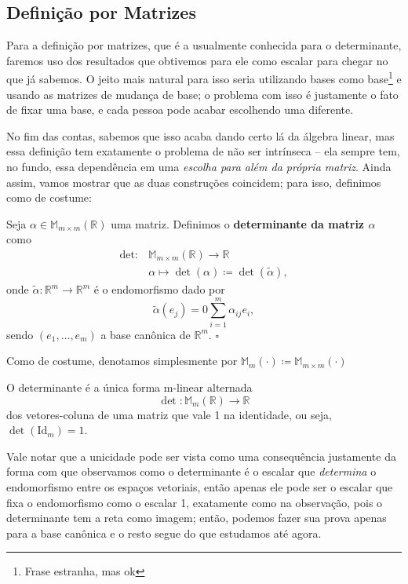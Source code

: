 \documentclass[../differential_forms.tex]{subfiles}
\begin{document}
\subsection{Definição por Matrizes}
Para a definição por matrizes, que é a usualmente conhecida para o determinante, faremos uso dos resultados que obtivemos para ele como
escalar para chegar no que já sabemos. O jeito mais natural para isso seria utilizando bases como base\footnote{Frase estranha, mas ok}
e usando as matrizes de mudança de base; o problema com isso é justamente o fato de fixar uma base, e cada pessoa pode acabar escolhendo
uma diferente.

No fim das contas, sabemos que isso acaba dando certo lá da álgebra linear, mas essa definição tem exatamente o problema de não ser
intrínseca -- ela sempre tem, no fundo, essa dependência em uma \textit{escolha para além da própria matriz}. Ainda assim, vamos mostrar
que as duas construções coincidem; para isso, definimos como de costume:
\begin{def*}
	Seja \(\alpha \in \mathbb{M}_{m\times m}(\mathbb{R})\) uma matriz. Definimos o \textbf{determinante da matriz \(\alpha \)} como
	\begin{align*}
		\mathrm{det}: & \mathbb{M}_{m\times m}(\mathbb{R})\rightarrow \mathbb{R}             \\
		              & \alpha \longmapsto \det{(\alpha )}\coloneqq \det{(\tilde{\alpha })},
	\end{align*}
	onde \(\tilde{\alpha }:\mathbb{R}^{m}\rightarrow \mathbb{R}^{m}\) é o endomorfismo dado por
	\[
		\tilde{\alpha }(e_{j}) =0\sum\limits_{i=1}^{m}\alpha_{ij}e_{i},
	\]
	sendo \((e_1, \dotsc , e_{m})\) a base canônica de \(\mathbb{R}^{m}\). \(\square\)
\end{def*}
Como de costume, denotamos simplesmente por \( \mathbb{M}_{m}(\cdot ) \coloneqq \mathbb{M}_{m \times m}(\cdot )\)
\begin{prop*}
	O determinante é a única forma m-linear alternada
	\[
		\det: \mathbb{M}_{m}(\mathbb{R})\rightarrow \mathbb{R}
	\]
	dos vetores-coluna de uma matriz que vale 1 na identidade, ou seja, \(\det{(\mathrm{Id}_{m})}=1\).
\end{prop*}
Vale notar que a unicidade pode ser vista como uma consequência justamente da forma com que observamos como o determinante é o escalar que \textit{determina}
o endomorfismo entre os espaços vetoriais, então apenas ele pode ser o escalar que fixa o endomorfismo como o escalar 1, exatamente como na
observação, pois o determinante tem a reta como imagem; então, podemos fazer sua prova apenas para a base canônica e o resto segue do que estudamos
até agora.
\end{document}
